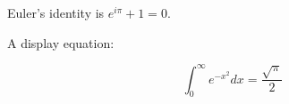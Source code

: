 Euler’s identity is $e^{i\pi} + 1 = 0$.

A display equation:

\[
\int_0^\infty e^{-x^2} dx = \frac{\sqrt{\pi}}{2}
\]
